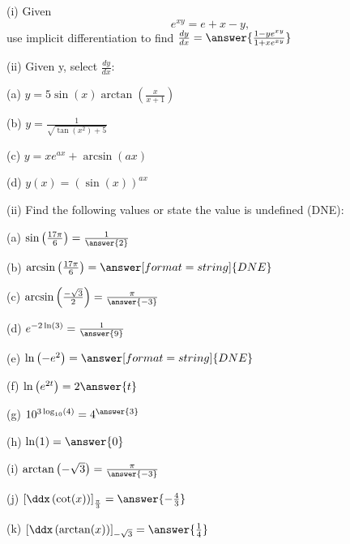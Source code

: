 \documentclass{ximera}
\begin{document}
\begin{exercise}
(i) Given $$e^{xy}=e+x-y,$$ use implicit differentiation to find $\frac{dy}{dx}=\answer{\frac{1-ye^{xy}}{1+xe^{xy}}}$

(ii) Given y, select $\frac{dy}{dx}$:

(a) $y=5\sin(x)\arctan\left(\frac{x}{x+1}\right)$
\begin{multipleChoice}
\end{multipleChoice}
(b) $y=\frac{1}{\sqrt{\tan(x^2)+5}}$
\begin{multipleChoice}
\end{multipleChoice}

(c) $y=xe^{ax}+\arcsin(ax)$
\begin{multipleChoice}
\end{multipleChoice}

(d) $y(x)=\left(\sin(x)\right)^{ax}$
\begin{multipleChoice}
\end{multipleChoice}

(ii) Find the following values or state the value is undefined (DNE):

(a) $\sin\left(\frac{17\pi}{6}\right)=\frac{1}{\answer{2}}$

(b) $\arcsin\left(\frac{17\pi}{6}\right)=\answer[format=string]{DNE}$

(c) $\arcsin\left(\frac{-\sqrt{3}}{2}\right)=\frac{\pi}{\answer{-3}}$

(d) $e^{-2\ln(3)}=\frac{1}{\answer{9}}$

(e) $\ln\left(-e^2\right)=\answer[format=string]{DNE}$

(f) $\ln\left(e^{2t}\right)=2\answer{t}$

(g) $10^{3\log_{10}(4)}=4^{\answer{3}}$

(h) $\ln(1)=\answer{0}$

(i) $\arctan\left(-\sqrt{3}\right)=\frac{\pi}{\answer{-3}}$

(j) $\left[\ddx\left(\cot(x)\right)\right]_{\frac{\pi}{3}}=\answer{-\frac{4}{3}}$

(k) $\left[\ddx\left(\arctan(x)\right)\right]_{-\sqrt{3}}=\answer{\frac{1}{4}}$
\end{exercise}
\end{document}
